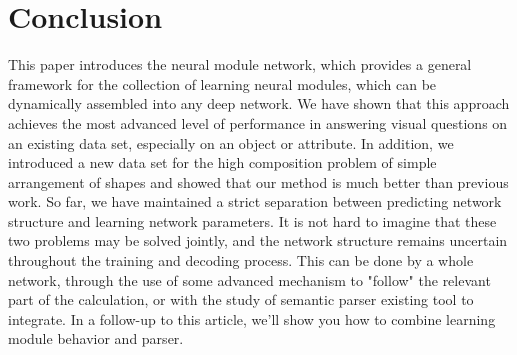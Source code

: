 \documentclass[a4paper,18pt]{article}
\begin{document}
\section{Conclusion}
This paper introduces the neural module network, which provides a general framework for the collection of learning neural modules, which can be dynamically assembled into any deep network. We have shown that this approach achieves the most advanced level of performance in answering visual questions on an existing data set, especially on an object or attribute. In addition, we introduced a new data set for the high composition problem of simple arrangement of shapes and showed that our method is much better than previous work. So far, we have maintained a strict separation between predicting network structure and learning network parameters. It is not hard to imagine that these two problems may be solved jointly, and the network structure remains uncertain throughout the training and decoding process. This can be done by a whole network, through the use of some advanced mechanism to "follow" the relevant part of the calculation, or with the study of semantic parser\cite{Krishnamurthyi_2015_Jointly} existing tool to integrate. In a follow-up to this article, we'll show you how to combine learning module behavior and parser.

	
\small{
}
%  
%
 
   
\end{document}
